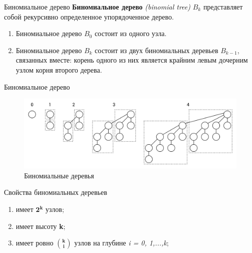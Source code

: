 


\begin{frame}[noframenumbering]
	\titlepage
\end{frame}


\begin{frame}{Биномиальное дерево}
	\textbf{Биномиальное дерево} \textit{(binomial tree)} $B_k$ представляет собой рекурсивно определенное упорядоченное дерево.
	\begin{enumerate}
		\item Биномиальное дерево $B_0$ состоит из одного узла.
		\item Биномиальное дерево $B_k$ состоит из двух биномиальных деревьев $B_{k−1}$,
		связанных вместе: корень одного из них является крайним левым дочерним узлом корня второго дерева.
	\end{enumerate}
\end{frame}

\begin{frame}{Биномиальное дерево} 
	\begin{figure}
		\includegraphics[width=0.9\linewidth]{images/binom-trees.png}
		\caption{Биномиальные деревья}
	\end{figure}
\end{frame}


\begin{frame}{Свойства биномиальных деревьев}
	\begin{enumerate}
		\item имеет $\mathbf{2^k}$ узлов;
		\item имеет высоту \textbf{k};
		\item имеет ровно $\mathbf{\binom{k}{i}}$ узлов на глубине \textit{i = 0, 1,...,k};
	\end{enumerate}
\end{frame}


